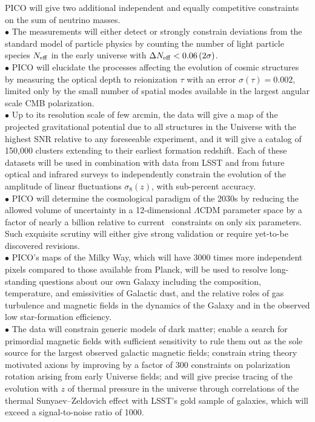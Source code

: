 \documentclass[PICOAPC.tex]{subfiles}
\begin{document}
PICO will give two additional independent and equally competitive constraints on the sum of neutrino masses. \\
$\bullet$ The measurements will either detect or strongly constrain deviations from the standard model of particle physics by counting the number of light particle species $N_{\rm eff}$ in the early universe with $\Delta N_{\rm eff} < 0.06 \, (2\sigma)$.  \\
$\bullet$ PICO will elucidate the processes affecting the evolution of cosmic structures by measuring the optical depth to reionization $\tau$ with an error $\sigma(\tau) = 0.002$, limited only by the small number of spatial modes available in the largest angular scale CMB polarization. \\
$\bullet$ Up to its resolution scale of few arcmin, the data will give a map of the projected gravitational potential due to all structures in the Universe with the highest \ac{SNR} relative to any foreseeable experiment, and it will give a catalog of 150,000 clusters extending to their earliest formation redshift. Each of these datasets will be used in combination with data from LSST and from future optical and infrared surveys to independently constrain the evolution of the amplitude of linear fluctuations $\sigma_{8}(z)$, with sub-percent accuracy.  \\
$\bullet$ PICO will determine the cosmological paradigm of the 2030s by reducing the allowed volume of uncertainty in a 12-dimensional $ \Lambda$CDM parameter space by a factor of nearly a billion relative to current \planck\ constraints on only six parameters. Such exquisite scrutiny will either give strong validation or require yet-to-be discovered revisions. \\
$\bullet$ PICO's maps of the Milky Way, which will have 3000 times more independent pixels compared to those available from Planck, will be used to resolve long-standing questions about our own Galaxy including the 
composition, temperature, and emissivities of Galactic dust, and the relative roles of gas turbulence and magnetic fields in the dynamics of the Galaxy and in the observed low star-formation efficiency. \\
$\bullet$ The data will constrain generic models of dark matter; enable a search for primordial magnetic fields with sufficient sensitivity to rule them out as the sole source for the largest observed galactic magnetic fields; constrain string theory motivated axions by improving by a factor of 300 constraints on polarization rotation arising from early Universe fields;  and will give precise tracing of the evolution with $z$ of thermal pressure in the universe through correlations of the thermal Sunyaev--Zeldovich effect with LSST's gold sample of galaxies, which will exceed a signal-to-noise ratio of 1000. 
\end{document}
